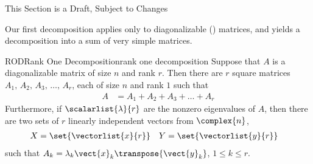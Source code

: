 %
{\sc\large This Section is a Draft, Subject to Changes}\par\bigskip
%
Our first decomposition applies only to diagonalizable () matrices, and yields a decomposition into a sum of very simple matrices.
%
\begin{theorem}{ROD}{Rank One Decomposition}{rank one decomposition}
Suppose that $A$ is a diagonalizable matrix of size $n$ and rank $r$.  Then there are $r$ square matrices $A_1,\,A_2,\,A_3,\,\dots,\,A_r$, each of size $n$ and rank $1$ such that
%
\begin{align*}
A&=A_1+A_2+A_3+\dots+A_r
\end{align*}
%
Furthermore, if $\scalarlist{\lambda}{r}$ are the nonzero eigenvalues of $A$, then there are two sets of $r$ linearly independent vectors from $\complex{n}$,
%
\begin{align*}
X&=\set{\vectorlist{x}{r}}
&
Y&=\set{\vectorlist{y}{r}}
\end{align*}
%
such that $A_k=\lambda_k\vect{x}_k\transpose{\vect{y}_k}$, $1\leq k\leq r$.
\end{theorem}
%
